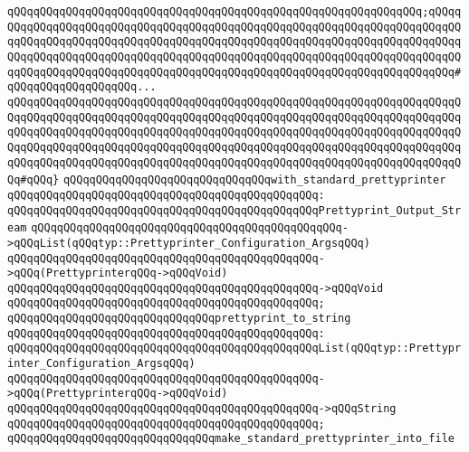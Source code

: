 \verb|qQQqqQQqqQQqqQQqqQQqqQQqqQQqqQQqqQQqqQQqqQQqqQQqqQQqqQQqqQQqqQQq;qQQqqQQqqQQqqQQqqQQqqQQqqQQqqQQqqQQqqQQqqQQqqQQqqQQqqQQqqQQqqQQqqQQqqQQqqQQqqQQqqQQqqQQqqQQqqQQqqQQqqQQqqQQqqQQqqQQqqQQqqQQqqQQqqQQqqQQqqQQqqQQqqQQqqQQqqQQqqQQqqQQqqQQqqQQqqQQqqQQqqQQqqQQqqQQqqQQqqQQqqQQqqQQqqQQqqQQqqQQqqQQqqQQqqQQqqQQqqQQqqQQqqQQqqQQqqQQqqQQqqQQqqQQqqQQqqQQqqQQqqQQq#qQQqqQQqqQQqqQQqqQQq...|\newline
\verb|qQQqqQQqqQQqqQQqqQQqqQQqqQQqqQQqqQQqqQQqqQQqqQQqqQQqqQQqqQQqqQQqqQQqqQQqqQQqqQQqqQQqqQQqqQQqqQQqqQQqqQQqqQQqqQQqqQQqqQQqqQQqqQQqqQQqqQQqqQQqqQQqqQQqqQQqqQQqqQQqqQQqqQQqqQQqqQQqqQQqqQQqqQQqqQQqqQQqqQQqqQQqqQQqqQQqqQQqqQQqqQQqqQQqqQQqqQQqqQQqqQQqqQQqqQQqqQQqqQQqqQQqqQQqqQQqqQQqqQQqqQQqqQQqqQQqqQQqqQQqqQQqqQQqqQQqqQQqqQQqqQQqqQQqqQQqqQQqqQQqqQQqqQQqqQQq#qQQq}|\newline
\newline
\verb|qQQqqQQqqQQqqQQqqQQqqQQqqQQqqQQqwith_standard_prettyprinter|\newline
\verb|qQQqqQQqqQQqqQQqqQQqqQQqqQQqqQQqqQQqqQQqqQQqqQQq:|\newline
\verb|qQQqqQQqqQQqqQQqqQQqqQQqqQQqqQQqqQQqqQQqqQQqqQQqPrettyprint_Output_Stream|\newline
\verb|qQQqqQQqqQQqqQQqqQQqqQQqqQQqqQQqqQQqqQQqqQQqqQQq->qQQqList(qQQqtyp::Prettyprinter_Configuration_ArgsqQQq)|\newline
\verb|qQQqqQQqqQQqqQQqqQQqqQQqqQQqqQQqqQQqqQQqqQQqqQQq->qQQq(PrettyprinterqQQq->qQQqVoid)|\newline
\verb|qQQqqQQqqQQqqQQqqQQqqQQqqQQqqQQqqQQqqQQqqQQqqQQq->qQQqVoid|\newline
\verb|qQQqqQQqqQQqqQQqqQQqqQQqqQQqqQQqqQQqqQQqqQQqqQQq;|\newline
\newline
\verb|qQQqqQQqqQQqqQQqqQQqqQQqqQQqqQQqprettyprint_to_string|\newline
\verb|qQQqqQQqqQQqqQQqqQQqqQQqqQQqqQQqqQQqqQQqqQQqqQQq:|\newline
\verb|qQQqqQQqqQQqqQQqqQQqqQQqqQQqqQQqqQQqqQQqqQQqqQQqList(qQQqtyp::Prettyprinter_Configuration_ArgsqQQq)|\newline
\verb|qQQqqQQqqQQqqQQqqQQqqQQqqQQqqQQqqQQqqQQqqQQqqQQq->qQQq(PrettyprinterqQQq->qQQqVoid)|\newline
\verb|qQQqqQQqqQQqqQQqqQQqqQQqqQQqqQQqqQQqqQQqqQQqqQQq->qQQqString|\newline
\verb|qQQqqQQqqQQqqQQqqQQqqQQqqQQqqQQqqQQqqQQqqQQqqQQq;|\newline
\newline
\verb|qQQqqQQqqQQqqQQqqQQqqQQqqQQqqQQqmake_standard_prettyprinter_into_file|\newline
